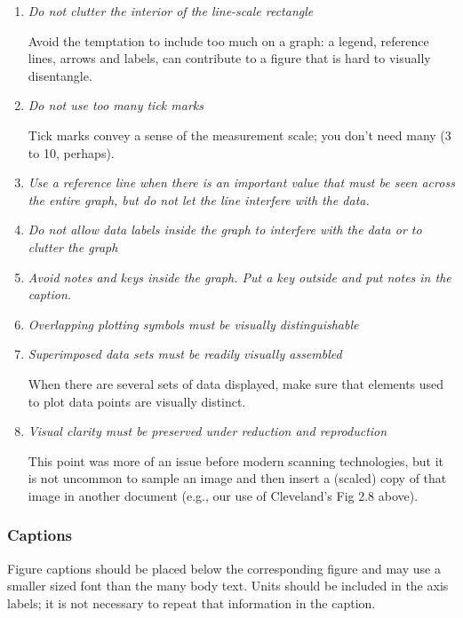\begin{enumerate}
\item	\textit{Do not clutter the interior of the line-scale rectangle}

Avoid the temptation to include too much on a graph: a legend, reference lines, arrows and labels, can contribute to a figure that is hard to visually disentangle.

\item	\textit{Do not use too many tick marks}

Tick marks convey a sense of the measurement scale; you don’t need many (3 to 10, perhaps).

\item	\textit{Use a reference line when there is an important value that must be seen across the entire graph, but do not let the line interfere with the data.}

\item	\textit{Do not allow data labels inside the graph to interfere with the data or to clutter the graph}

\item	\textit{Avoid notes and keys inside the graph. Put a key outside and put notes in the caption.}

\item	\textit{Overlapping plotting symbols must be visually distinguishable} 

\item	\textit{Superimposed data sets must be readily visually assembled}

When there are several sets of data displayed, make sure that elements used to plot data points are visually distinct.

\item	\textit{Visual clarity must be preserved under reduction and reproduction}

This point was more of an issue before modern scanning technologies, but it is not uncommon to sample an image and then insert a (scaled) copy of that image in another document (e.g., our use of Cleveland's Fig 2.8 above).

\end{enumerate}

\subsubsection{Captions}
Figure captions should be placed below the corresponding figure and may use a smaller sized font than the many body text. Units should be included in the axis labels; it is not necessary to repeat that information in the caption.


